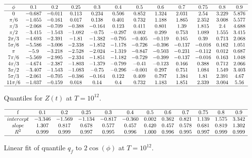 \documentclass[twoside]{article}
\begin{document}
\begin{table}
\centering \(\begin{array}{cccccccccccc}
\hline
\phi&0.1&0.2&0.25&0.3&0.4&0.5&0.6&0.7&0.75&0.8&0.9 \\
\hline
0&-0.687&-0.011&0.113&0.234&0.506&0.852&1.324&2.031&2.54&3.229&5.876\\
\pi/6 &-1.055&-0.161&0.017&0.138&0.401&0.732&1.188&1.865&2.352&3.008&5.577\\
\pi/3 &-2.068&-0.709&-0.388&-0.164&0.123&0.411&0.801&1.39&1.815&2.4&4.688\\
\pi/2 &-3.415&-1.543&-1.082&-0.75&-0.297&0.002&0.299&0.753&1.089&1.555&3.415\\
2\pi/3 &-4.693&-2.391&-1.81&-1.382&-0.795&-0.405&-0.119&0.165&0.39&0.713&2.068\\
5\pi/6 &-5.586&-3.006&-2.338&-1.852&-1.178&-0.726&-0.396&-0.137&-0.016&0.162&1.051\\
\pi &-5.9&-3.218&-2.528&-2.024&-1.319&-0.847&-0.503&-0.231&-0.112&0.012&0.687\\
7\pi/6 &-5.569&-2.995&-2.334&-1.851&-1.182&-0.729&-0.399&-0.137&-0.016&0.163&1.048\\
4\pi/3 &-4.674&-2.387&-1.803&-1.379&-0.799&-0.41&-0.123&0.166&0.388&0.712&2.066\\
3\pi/2 &-3.407&-1.543&-1.083&-0.75&-0.296&-0.001&0.297&0.751&1.084&1.549&3.403\\
5\pi/3 &-2.061&-0.705&-0.386&-0.164&0.122&0.409&0.797&1.384&1.81&2.391&4.67\\
11\pi/6 &-1.037&-0.159&0.018&0.14&0.4&0.732&1.183&1.851&2.339&3.004&5.56\\

\hline
\end{array}\)
\caption{Quantiles  for  $Z(t)$ at $T=10^{12}$.}
\label{tab:quantiles12}
\end{table}


\begin{table}
\centering \(\begin{array}{cccccccccccc}
\hline
$f$&0.1&0.2&0.25&0.3&0.4&0.5&0.6&0.7&0.75&0.8&0.9\\
\hline
intercept&-3.346&-1.569&-1.134&-0.817&-0.360&0.002&0.362&0.821&1.139&1.575&3.342\\
slope&1.307&0.817&0.678&0.577&0.457&0.420&0.457&0.578&0.681&0.819&1.302\\
R^2&0.999&0.999&0.997&0.995&0.996&1.000&0.996&0.995&0.997&0.999&0.999\\
\hline
\end{array}\)
\caption{Linear fit of quantile $q_f$ to $2\cos(\phi)$ at $T=10^{12}$.}
\label{tab:fit12}
\end{table}
\end{document}
